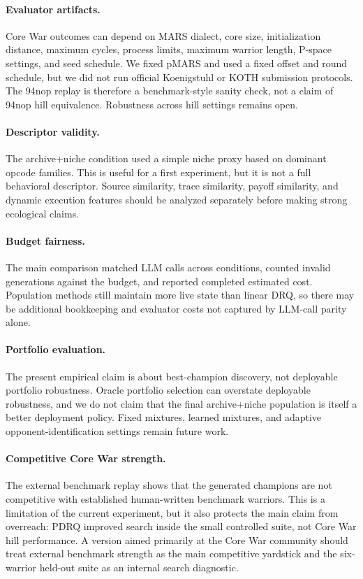 \documentclass[11pt]{article}
\begin{document}
\paragraph{Evaluator artifacts.}
Core War outcomes can depend on MARS dialect, core size, initialization distance, maximum cycles, process limits, maximum warrior length, P-space settings, and seed schedule. We fixed pMARS and used a fixed offset and round schedule, but we did not run official Koenigstuhl or KOTH submission protocols. The 94nop replay is therefore a benchmark-style sanity check, not a claim of 94nop hill equivalence. Robustness across hill settings remains open.

\paragraph{Descriptor validity.}
The archive+niche condition used a simple niche proxy based on dominant opcode families. This is useful for a first experiment, but it is not a full behavioral descriptor. Source similarity, trace similarity, payoff similarity, and dynamic execution features should be analyzed separately before making strong ecological claims.

\paragraph{Budget fairness.}
The main comparison matched LLM calls across conditions, counted invalid generations against the budget, and reported completed estimated cost. Population methods still maintain more live state than linear DRQ, so there may be additional bookkeeping and evaluator costs not captured by LLM-call parity alone.

\paragraph{Portfolio evaluation.}
The present empirical claim is about best-champion discovery, not deployable portfolio robustness. Oracle portfolio selection can overstate deployable robustness, and we do not claim that the final archive+niche population is itself a better deployment policy. Fixed mixtures, learned mixtures, and adaptive opponent-identification settings remain future work.

\paragraph{Competitive Core War strength.}
The external benchmark replay shows that the generated champions are not competitive with established human-written benchmark warriors. This is a limitation of the current experiment, but it also protects the main claim from overreach: PDRQ improved search inside the small controlled suite, not Core War hill performance. A version aimed primarily at the Core War community should treat external benchmark strength as the main competitive yardstick and the six-warrior held-out suite as an internal search diagnostic.
\end{document}
